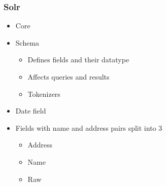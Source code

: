 \documentclass{beamer}
\begin{document}
\begin{frame}

\frametitle{Solr}

\begin{itemize}

\item Core

\item Schema

\begin{itemize}
\item Defines fields and their datatype
\item Affects queries and results
\item Tokenizers 
\end{itemize}

\item Date field \\

\item Fields with name and address pairs split into 3

\begin{itemize}
\item Address
\item Name
\item Raw 
\end{itemize}


\end{itemize}

\end{frame}
\end{document}
